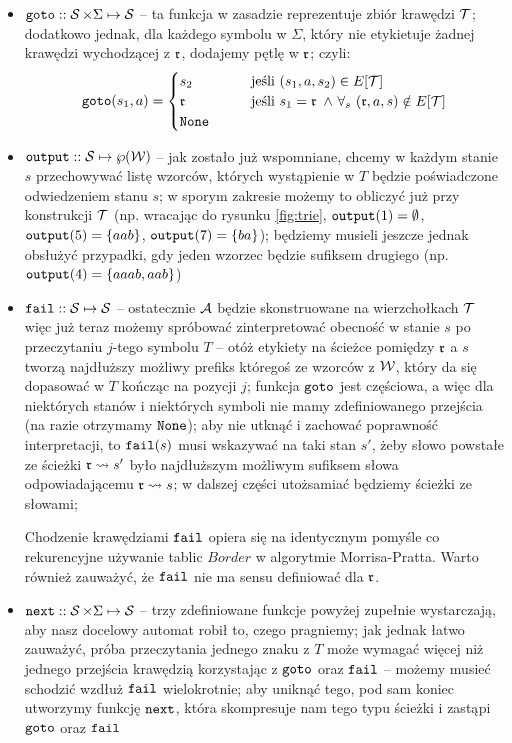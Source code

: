 \begin{itemize}
    \item $\operatorname{\texttt{goto}}::\operatorname{\mathcal{S}}\times\Sigma\mapsto\operatorname{\mathcal{S}}$ -- ta funkcja w zasadzie reprezentuje zbiór krawędzi $\operatorname{\mathcal{T}}$; dodatkowo jednak, dla każdego symbolu w $\Sigma$, który nie etykietuje żadnej krawędzi wychodzącej z $\operatorname{\mathfrak{r}}$, dodajemy pętlę w $\operatorname{\mathfrak{r}}$; czyli:
    \begin{gather*}
        \goto(s_1, a)=\begin{cases}
        s_2 &\qquad \text{jeśli } (s_1,a,s_2)\in E[\trie] \\
        \rot &\qquad \text{jeśli } s_1=\rot\ \wedge\ \forall_{s}\ (\rot,a,s)\notin E[\trie] \\
        \none
        \end{cases}
    \end{gather*}

    \item $\operatorname{\texttt{output}}::\operatorname{\mathcal{S}}\mapsto\wp(\operatorname{\mathcal{W}})$ -- jak zostało już wspomniane, chcemy w każdym stanie $s$ przechowywać listę wzorców, których wystąpienie w $T$ będzie poświadczone odwiedzeniem stanu $s$; w sporym zakresie możemy to obliczyć już przy konstrukcji $\operatorname{\mathcal{T}}$ (np. wracając do rysunku \ref{fig:trie}, $\operatorname{\texttt{output}}(1)=\emptyset$, $\operatorname{\texttt{output}}(5)=\{aab\}$, $\operatorname{\texttt{output}}(7)=\{ba\}$); będziemy musieli jeszcze jednak obsłużyć przypadki, gdy jeden wzorzec będzie sufiksem drugiego (np. $\operatorname{\texttt{output}}(4)=\{aaab, aab\}$)

    \item $\operatorname{\texttt{fail}}::\operatorname{\mathcal{S}}\mapsto\operatorname{\mathcal{S}}$ -- ostatecznie $\operatorname{\mathcal{A}}$ będzie skonstruowane na wierzchołkach $\operatorname{\mathcal{T}}$ więc już teraz możemy spróbować zinterpretować obecność w stanie $s$ po przeczytaniu $j$-tego symbolu $T$ -- otóż etykiety na ścieżce pomiędzy $\operatorname{\mathfrak{r}}$ a $s$ tworzą najdłuższy możliwy prefiks któregoś ze wzorców z $\operatorname{\mathcal{W}}$, który da się dopasować w $T$ kończąc na pozycji $j$; funkcja $\operatorname{\texttt{goto}}$ jest częściowa, a więc dla niektórych stanów i niektórych symboli nie mamy zdefiniowanego przejścia (na razie otrzymamy $\operatorname{\texttt{None}}$); aby nie utknąć i zachować poprawność interpretacji, to $\operatorname{\texttt{fail}}(s)$ musi wskazywać na taki stan $s'$, żeby słowo powstałe ze ścieżki $\operatorname{\mathfrak{r}}\rightsquigarrow s'$ było najdłuższym możliwym sufiksem słowa odpowiadającemu $\operatorname{\mathfrak{r}}\rightsquigarrow s$; w dalszej części utożsamiać będziemy ścieżki ze słowami;

    Chodzenie krawędziami $\operatorname{\texttt{fail}}$ opiera się na identycznym pomyśle co rekurencyjne używanie tablic $Border$ w algorytmie Morrisa-Pratta. Warto również zauważyć, że $\operatorname{\texttt{fail}}$ nie ma sensu definiować dla $\operatorname{\mathfrak{r}}$.

    \item $\operatorname{\texttt{next}}::\operatorname{\mathcal{S}}\times\Sigma\mapsto\operatorname{\mathcal{S}}$ -- trzy zdefiniowane funkcje powyżej zupełnie wystarczają, aby nasz docelowy automat robił to, czego pragniemy; jak jednak łatwo zauważyć, próba przeczytania jednego znaku z $T$ może wymagać więcej niż jednego przejścia krawędzią korzystając z $\operatorname{\texttt{goto}}$ oraz $\operatorname{\texttt{fail}}$ -- możemy musieć schodzić wzdłuż $\operatorname{\texttt{fail}}$ wielokrotnie; aby uniknąć tego, pod sam koniec utworzymy funkcję $\operatorname{\texttt{next}}$, która skompresuje nam tego typu ścieżki i zastąpi $\operatorname{\texttt{goto}}$ oraz $\operatorname{\texttt{fail}}$
\end{itemize}


